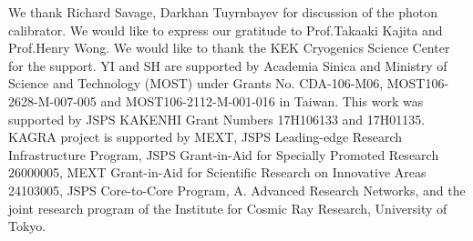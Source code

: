 \documentclass[A4]{spie}  %
\begin{document}
We thank Richard Savage, Darkhan Tuyrnbayev for discussion of the photon calibrator. We would like to express our gratitude to Prof.Takaaki Kajita and Prof.Henry Wong. We would like to thank the KEK Cryogenics Science Center for the support. YI and SH are supported by Academia Sinica and Ministry of Science and Technology (MOST) under Grants No. CDA-106-M06, MOST106-2628-M-007-005 and MOST106-2112-M-001-016 in Taiwan. This work was supported by JSPS KAKENHI Grant Numbers 17H106133 and 17H01135. KAGRA project is supported by MEXT, JSPS Leading-edge Research Infrastructure Program, JSPS Grant-in-Aid for Specially Promoted Research 26000005, MEXT Grant-in-Aid for Scientific Research on Innovative Areas 24103005, JSPS Core-to-Core Program, A. Advanced Research Networks, and the joint research program of the Institute for Cosmic Ray Research, University of Tokyo.


\end{document}
